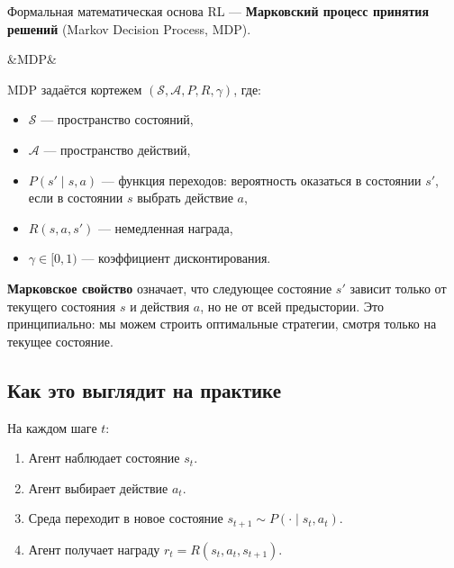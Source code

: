\documentclass[a4paper, 11pt]{article}
\newenvironment{defbox}[1][]{%
  \begin{mdframed}[style=defstyle]
  \ifx&#1&\else{\bfseries\color{defblue}#1.}\quad\fi\ignorespaces
}{%
  \end{mdframed}
}
\begin{document}
Формальная математическая основа RL — \textbf{Марковский процесс принятия
решений} (Markov Decision Process, MDP).

\begin{defbox}[MDP]
MDP задаётся кортежем $(\mathcal{S}, \mathcal{A}, P, R, \gamma)$, где:
\begin{itemize}[itemsep=2pt]
  \item $\mathcal{S}$ — пространство состояний,
  \item $\mathcal{A}$ — пространство действий,
  \item $P(s' \mid s, a)$ — функция переходов: вероятность оказаться в
        состоянии $s'$, если в состоянии $s$ выбрать действие $a$,
  \item $R(s, a, s')$ — немедленная награда,
  \item $\gamma \in [0, 1)$ — коэффициент дисконтирования.
\end{itemize}
\end{defbox}

\textbf{Марковское свойство} означает, что следующее состояние $s'$ зависит
только от текущего состояния $s$ и действия $a$, но не от всей предыстории.
Это принципиально: мы можем строить оптимальные стратегии, смотря только на
текущее состояние.

\subsection{Как это выглядит на практике}

На каждом шаге $t$:
\begin{enumerate}[itemsep=2pt]
  \item Агент наблюдает состояние $s_t$.
  \item Агент выбирает действие $a_t$.
  \item Среда переходит в новое состояние $s_{t+1} \sim P(\cdot \mid s_t, a_t)$.
  \item Агент получает награду $r_t = R(s_t, a_t, s_{t+1})$.
\end{enumerate}

\begin{center}
\end{center}
\end{document}
